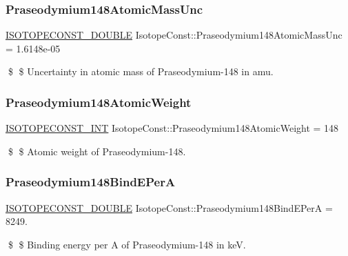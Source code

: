 \subsubsection{\texorpdfstring{Praseodymium148\+Atomic\+Mass\+Unc}{Praseodymium148AtomicMassUnc}}
{\footnotesize\ttfamily \mbox{\hyperlink{group___isotope_const-_macros_ga8f45a7272ce02c0b4c65c44636ed719a}{I\+S\+O\+T\+O\+P\+E\+C\+O\+N\+S\+T\+\_\+\+D\+O\+U\+B\+LE}} Isotope\+Const\+::\+Praseodymium148\+Atomic\+Mass\+Unc = 1.\+6148e-\/05}

\$ \$ Uncertainty in atomic mass of Praseodymium-\/148 in amu. \mbox{\label{group___isotope_const-_praseodymium-_pr148_ga7051f4433b3e8ff999fa92bd0d8e4dae}} 
\subsubsection{\texorpdfstring{Praseodymium148\+Atomic\+Weight}{Praseodymium148AtomicWeight}}
{\footnotesize\ttfamily \mbox{\hyperlink{group___isotope_const-_macros_ga5f18360b3e99483a35c32d789e62621c}{I\+S\+O\+T\+O\+P\+E\+C\+O\+N\+S\+T\+\_\+\+I\+NT}} Isotope\+Const\+::\+Praseodymium148\+Atomic\+Weight = 148}

\$ \$ Atomic weight of Praseodymium-\/148. \mbox{\label{group___isotope_const-_praseodymium-_pr148_ga948dd728754cb2f2242c3c149684a41b}} 
\subsubsection{\texorpdfstring{Praseodymium148\+Bind\+E\+PerA}{Praseodymium148BindEPerA}}
{\footnotesize\ttfamily \mbox{\hyperlink{group___isotope_const-_macros_ga8f45a7272ce02c0b4c65c44636ed719a}{I\+S\+O\+T\+O\+P\+E\+C\+O\+N\+S\+T\+\_\+\+D\+O\+U\+B\+LE}} Isotope\+Const\+::\+Praseodymium148\+Bind\+E\+PerA = 8249.}

\$ \$ Binding energy per A of Praseodymium-\/148 in keV. \mbox{\label{group___isotope_const-_praseodymium-_pr148_gaaf68b930c6646469e24789621d6533af}} 
